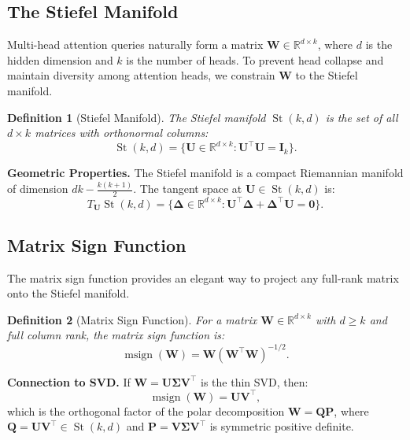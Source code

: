 \documentclass[twocolumn]{article}
\newtheorem{definition}{Definition}
\DeclareMathOperator{\msign}{msign}
\DeclareMathOperator{\St}{St}
\begin{document}
\subsection{The Stiefel Manifold}

Multi-head attention queries naturally form a matrix $\mathbf{W} \in \mathbb{R}^{d \times k}$, where $d$ is the hidden dimension and $k$ is the number of heads. To prevent head collapse and maintain diversity among attention heads, we constrain $\mathbf{W}$ to the Stiefel manifold.

\begin{definition}[Stiefel Manifold]
\label{def:stiefel}
The Stiefel manifold $\St(k, d)$ is the set of all $d \times k$ matrices with orthonormal columns:
\begin{equation}
\St(k, d) = \{\mathbf{U} \in \mathbb{R}^{d \times k} : \mathbf{U}^\top \mathbf{U} = \mathbf{I}_k\}.
\end{equation}
\end{definition}

\textbf{Geometric Properties.} The Stiefel manifold is a compact Riemannian manifold of dimension $dk - \frac{k(k+1)}{2}$. The tangent space at $\mathbf{U} \in \St(k, d)$ is:
\begin{equation}
T_{\mathbf{U}}\St(k, d) = \{\mathbf{\Delta} \in \mathbb{R}^{d \times k} : \mathbf{U}^\top \mathbf{\Delta} + \mathbf{\Delta}^\top \mathbf{U} = \mathbf{0}\}.
\end{equation}

\subsection{Matrix Sign Function}
\label{sec:matrix-sign}

The matrix sign function provides an elegant way to project any full-rank matrix onto the Stiefel manifold.

\begin{definition}[Matrix Sign Function]
\label{def:msign}
For a matrix $\mathbf{W} \in \mathbb{R}^{d \times k}$ with $d \geq k$ and full column rank, the matrix sign function is:
\begin{equation}
\msign(\mathbf{W}) = \mathbf{W} (\mathbf{W}^\top \mathbf{W})^{-1/2}.
\label{eq:msign-def}
\end{equation}
\end{definition}

\textbf{Connection to SVD.} If $\mathbf{W} = \mathbf{U} \boldsymbol{\Sigma} \mathbf{V}^\top$ is the thin SVD, then:
\begin{equation}
\msign(\mathbf{W}) = \mathbf{U} \mathbf{V}^\top,
\end{equation}
which is the orthogonal factor of the polar decomposition $\mathbf{W} = \mathbf{Q}\mathbf{P}$, where $\mathbf{Q} = \mathbf{U}\mathbf{V}^\top \in \St(k, d)$ and $\mathbf{P} = \mathbf{V}\boldsymbol{\Sigma}\mathbf{V}^\top$ is symmetric positive definite.
\end{document}
